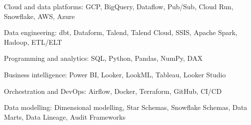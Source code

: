 

\begin{cvskillsnoncentered}

  \cvskill
{Cloud and data platforms:}
{GCP, BigQuery, Dataflow, Pub/Sub, Cloud Run, Snowflake, AWS, Azure}

\cvskill
{Data engineering:}
{dbt, Dataform, Talend, Talend Cloud, SSIS, Apache Spark, Hadoop, ETL/ELT}

\cvskill
{Programming and analytics:}
{SQL, Python, Pandas, NumPy, DAX}

\cvskill
{Business intelligence:}
{Power BI, Looker, LookML, Tableau, Looker Studio}

\cvskill
{Orchestration and DevOps:}
{Airflow, Docker, Terraform, GitHub, CI/CD}

\cvskill
{Data modelling:}
{Dimensional modelling, Star Schemas, Snowflake Schemas, Data Marts, Data Lineage, Audit Frameworks}

\end{cvskillsnoncentered}
